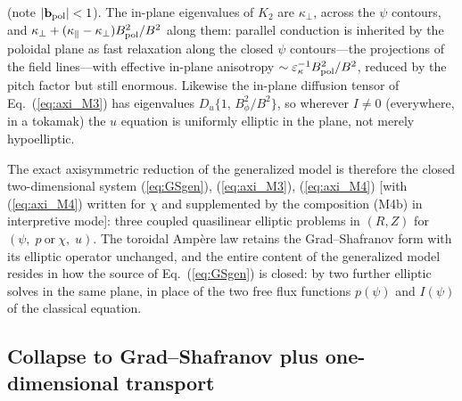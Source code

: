 \documentclass[english]{article}
\newcommand{\bb}{\mathbf{b}}
\begin{document}
(note $|\bb_{\rm pol}|<1$). The in-plane eigenvalues of $K_2$ are $\kappa_\perp$, across the
$\psi$ contours, and $\kappa_\perp+(\kappa_\parallel-\kappa_\perp)B_{\rm pol}^{2}/B^{2}$ along
them: parallel conduction is inherited by the poloidal plane as fast relaxation along the closed
$\psi$ contours---the projections of the field lines---with effective in-plane anisotropy
$\sim\varepsilon_\kappa^{-1}B_{\rm pol}^{2}/B^{2}$, reduced by the pitch factor but still
enormous. Likewise the in-plane diffusion tensor of Eq.~(\ref{eq:axi_M3}) has eigenvalues
$D_u\{1,\,B_\phi^{2}/B^{2}\}$, so wherever $I\neq0$ (everywhere, in a tokamak) the $u$ equation is
uniformly elliptic in the plane, not merely hypoelliptic.

The exact axisymmetric reduction of the generalized model is therefore the closed two-dimensional
system (\ref{eq:GSgen}), (\ref{eq:axi_M3}), (\ref{eq:axi_M4}) [with (\ref{eq:axi_M4}) written for
$\chi$ and supplemented by the composition (M4b) in interpretive mode]: three coupled quasilinear
elliptic problems in $(R,Z)$ for $(\psi,\;p\ \text{or}\ \chi,\;u)$. The toroidal Amp\`ere law
retains the Grad--Shafranov form with its elliptic operator unchanged, and the entire content of
the generalized model resides in how the source of Eq.~(\ref{eq:GSgen}) is closed: by two further
elliptic solves in the same plane, in place of the two free flux functions $p(\psi)$ and $I(\psi)$
of the classical equation.

\subsection{Collapse to Grad--Shafranov plus one-dimensional transport}
\label{sec:axisym_collapse}
\end{document}
